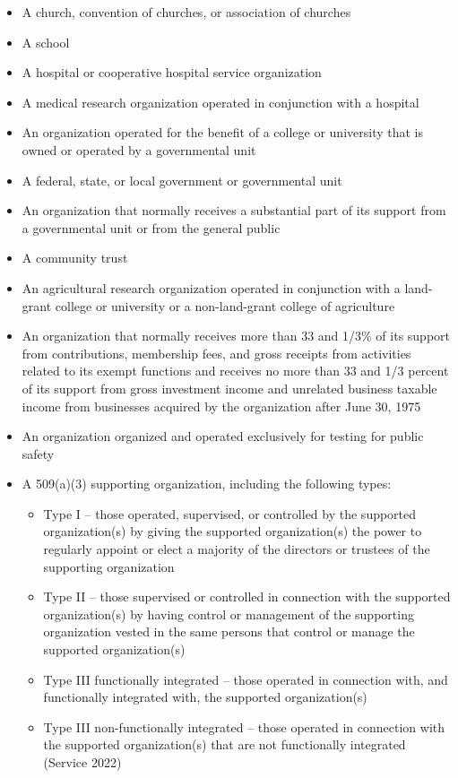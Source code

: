 \documentclass[
  letterpaper,
  DIV=11,
  numbers=noendperiod,
  oneside]{scrreprt}
\begin{document}
\begin{itemize}
\item
  A church, convention of churches, or association of churches
\item
  A school
\item
  A hospital or cooperative hospital service organization
\item
  A medical research organization operated in conjunction with a
  hospital
\item
  An organization operated for the benefit of a college or university
  that is owned or operated by a governmental unit
\item
  A federal, state, or local government or governmental unit
\item
  An organization that normally receives a substantial part of its
  support from a governmental unit or from the general public
\item
  A community trust
\item
  An agricultural research organization operated in conjunction with a
  land-grant college or university or a non-land-grant college of
  agriculture
\item
  An organization that normally receives more than 33 and 1/3\% of its
  support from contributions, membership fees, and gross receipts from
  activities related to its exempt functions and receives no more than
  33 and 1/3 percent of its support from gross investment income and
  unrelated business taxable income from businesses acquired by the
  organization after June 30, 1975
\item
  An organization organized and operated exclusively for testing for
  public safety
\item
  A 509(a)(3) supporting organization, including the following types:

  \begin{itemize}
  \item
    Type I -- those operated, supervised, or controlled by the supported
    organization(s) by giving the supported organization(s) the power to
    regularly appoint or elect a majority of the directors or trustees
    of the supporting organization
  \item
    Type II -- those supervised or controlled in connection with the
    supported organization(s) by having control or management of the
    supporting organization vested in the same persons that control or
    manage the supported organization(s)
  \item
    Type III functionally integrated -- those operated in connection
    with, and functionally integrated with, the supported
    organization(s)
  \item
    Type III non-functionally integrated -- those operated in connection
    with the supported organization(s) that are not functionally
    integrated (Service 2022)
  \end{itemize}
\end{itemize}
\end{document}

